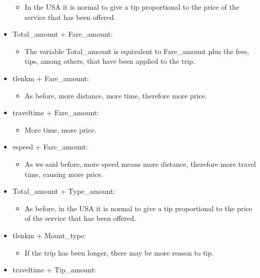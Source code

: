 \documentclass[
  18pt,
  a4paper]{article}
\providecommand{\tightlist}{%
  \setlength{\itemsep}{0pt}\setlength{\parskip}{0pt}}
\begin{document}
\begin{itemize}
  \begin{itemize}
  \tightlist
  \item
    In the USA it is normal to give a tip proportional to the price of
    the service that has been offered.
  \end{itemize}
\item
  Total\_amount + Fare\_amount:

  \begin{itemize}
  \tightlist
  \item
    The variable Total\_amount is equivalent to Fare\_amount plus the
    fees, tips, among others, that have been applied to the trip.
  \end{itemize}
\item
  tlenkm + Fare\_amount:

  \begin{itemize}
  \tightlist
  \item
    As before, more distance, more time, therefore more price.
  \end{itemize}
\item
  traveltime + Fare\_amount:

  \begin{itemize}
  \tightlist
  \item
    More time, more price.
  \end{itemize}
\item
  espeed + Fare\_amount:

  \begin{itemize}
  \tightlist
  \item
    As we said before, more speed means more distance, therefore more
    travel time, causing more price.
  \end{itemize}
\item
  Total\_amount + Type\_amount:

  \begin{itemize}
  \tightlist
  \item
    As before, in the USA it is normal to give a tip proportional to the
    price of the service that has been offered.
  \end{itemize}
\item
  tlenkm + Mount\_type:

  \begin{itemize}
  \tightlist
  \item
    If the trip has been longer, there may be more reason to tip.
  \end{itemize}
\item
  traveltime + Tip\_amount:


\end{itemize}
\end{document}
